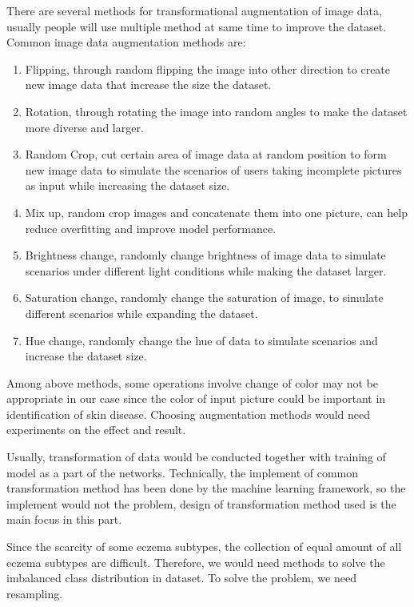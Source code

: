                 There are several methods for transformational augmentation of image data, usually people will use multiple method at same time to improve the dataset. Common image data augmentation methods are:
                \begin{enumerate}
                    \item Flipping, through random flipping the image into other direction to create new image data that increase the size the dataset.
                    \item Rotation, through rotating the image into random angles to make the dataset more diverse and larger.
                    \item Random Crop, cut certain area of image data at random position to form new image data to simulate the scenarios of users taking incomplete pictures as input while increasing the dataset size.
                    \item Mix up, random crop images and concatenate them into one picture, can help reduce overfitting and improve model performance.
                    \item Brightness change, randomly change brightness of image data to simulate scenarios under different light conditions while making the dataset larger.
                    \item Saturation change, randomly change the saturation of image, to simulate different scenarios while expanding the dataset.
                    \item Hue change, randomly change the hue of data to simulate scenarios and increase the dataset size.
                \end{enumerate}

                Among above methods, some operations involve change of color may not be appropriate in our case since the color of input picture could be important in identification of skin disease. Choosing augmentation methods would need experiments on the effect and result.
                
                Usually, transformation of data would be conducted together with training of model as a part of the networks. Technically, the implement of common transformation method has been done by the machine learning framework, so the implement would not the problem, design of transformation method used is the main focus in this part.

                Since the scarcity of some eczema subtypes, the collection of equal amount of all eczema subtypes are difficult. Therefore, we would need methods to solve the imbalanced class distribution in dataset. To solve the problem, we need resampling.

